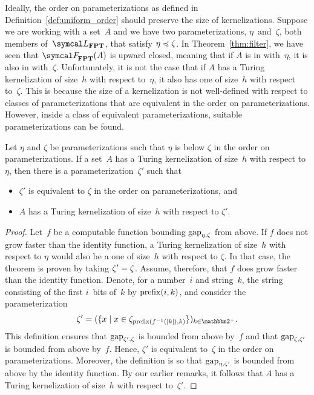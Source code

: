 Ideally, the order on parameterizations as defined in Definition~\ref{def:uniform_order} should preserve the size of kernelizations.
Suppose we are working with a set~$A$ and we have two parameterizations, $\eta$~and~$\zeta$, both members of~$\calL_\cl{FPT}$, that satisfy $\eta \preccurlyeq \zeta$.
In Theorem~\ref{thm:filter}, we have seen that $\calF_\cl{FPT}(A)$ is upward closed, meaning that if $A$ is in  with~$\eta$, it is also in  with~$\zeta$.
Unfortunately, it is not the case that if $A$ has a Turing kernelization of size~$h$ with respect to~$\eta$, it also has one of size~$h$ with respect to~$\zeta$.
This is because the size of a kernelization is not well-defined with respect to classes of parameterizations that are equivalent in the order on parameterizations.
However, inside a class of equivalent parameterizations, suitable parameterizations can be found.
\begin{theorem}
  Let $\eta$ and $\zeta$ be parameterizations such that $\eta$ is below $\zeta$ in the order on parameterizations.
  If a set~$A$ has a Turing kernelization of size~$h$ with respect to $\eta$, then there is a parameterization~$\zeta'$ such that
  \begin{itemize}
  \item $\zeta'$ is equivalent to $\zeta$ in the order on parameterizations, and
  \item $A$ has a Turing kernelization of size~$h$ with respect to $\zeta'$.
  \end{itemize}
\end{theorem}
\begin{proof}
  Let~$f$ be a computable function bounding $\operatorname{gap}_{\eta, \zeta}$ from above.
  If $f$ does not grow faster than the identity function, a Turing kernelization of size~$h$ with respect to $\eta$ would also be a one of size~$h$ with respect to $\zeta$.
  In that case, the theorem is proven by taking $\zeta' = \zeta$.
  Assume, therefore, that $f$ does grow faster than the identity function.
  Denote, for a number~$i$ and string~$k$, the string consisting of the first $i$~bits of~$k$ by $\operatorname{prefix}(i, k)$, and consider the parameterization
  \begin{equation*}
    \zeta' \deq (\{x \st x \in \zeta_{\prefix(f^{-1}(\length{k}), k)}\})_{k \in \binary^+}.
  \end{equation*}
  This definition ensures that $\operatorname{gap}_{\zeta', \zeta}$ is bounded from above by~$f$ and that $\operatorname{gap}_{\zeta, \zeta'}$ is bounded from above by~$f$.
  Hence, $\zeta'$ is equivalent to~$\zeta$ in the order on parameterizations.
  Moreover, the definition is so that $\operatorname{gap}_{\eta, \zeta'}$ is bounded from above by the identity function.
  By our earlier remarks, it follows that $A$ has a Turing kernelization of size~$h$ with respect to~$\zeta'$.
\end{proof}

